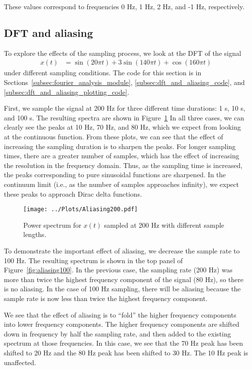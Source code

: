 \documentclass[twocolumn]{myarticle}
\begin{document}
These values correspond to frequencies 0 Hz, 1 Hz, 2 Hz, and -1 Hz, respectively.

\subsection{DFT and aliasing}
\label{subsec:dft_and_aliasing}

To explore the effects of the sampling process, we look at the DFT of the signal
\begin{align}
    x(t) &= \sin(20 \pi t) + 3 \sin(140 \pi t) + \cos(160 \pi t)
\end{align}
under different sampling conditions.
The code for this section is in Sections~\ref{subsec:fourier_analysis_module}, \ref{subsec:dft_and_aliasing_code}, and \ref{subsec:dft_and_aliasing_plotting_code}.

First, we sample the signal at 200 Hz for three different time durations: 1 s, 10 s, and 100 s.
The resulting spectra are shown in Figure~\ref{fig:aliasing200}
In all three cases, we can clearly see the peaks at 10 Hz, 70 Hz, and 80 Hz, which we expect from looking at the continuous function.
From these plots, we can see that the effect of increasing the sampling duration is to sharpen the peaks.
For longer sampling times, there are a greater number of samples, which has the effect of increasing the resolution in the frequency domain.
Thus, as the sampling time is increased, the peaks corresponding to pure sinusoidal functions are sharpened.
In the continuum limit (i.e., as the number of samples approaches infinity), we expect these peaks to approach Dirac delta functions.

\begin{figure}[ht]
    \centering
    \texttt{[image: ../Plots/Aliasing200.pdf]}
    \caption{Power spectrum for $ x(t) $ sampled at 200 Hz with different sample lengths.}
    \label{fig:aliasing200}
\end{figure}

To demonstrate the important effect of aliasing, we decrease the sample rate to 100 Hz.
The resulting spectrum is shown in the top panel of Figure~\ref{fig:aliasing100}.
In the previous case, the sampling rate (200 Hz) was more than twice the highest frequency component of the signal (80 Hz), so there is no aliasing.
In the case of 100 Hz sampling, there will be aliasing because the sample rate is now less than twice the highest frequency component.

We see that the effect of aliasing is to ``fold'' the higher frequency components into lower frequency components.
The higher frequency components are shifted down in frequency by half the sampling rate, and then added to the existing spectrum at those frequencies.
In this case, we see that the 70 Hz peak has been shifted to 20 Hz and the 80 Hz peak has been shifted to 30 Hz.
The 10 Hz peak is unaffected.
\end{document}
